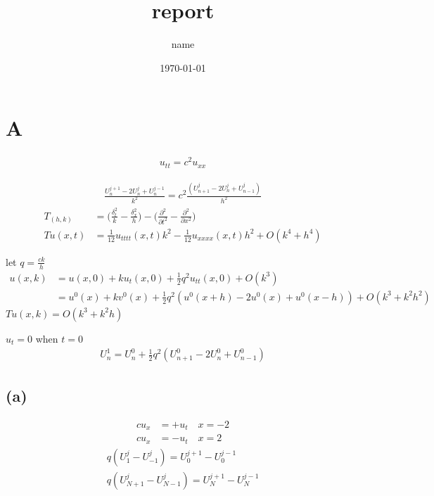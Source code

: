 \documentclass[en,hazy,screen,blue,normal]{elegantnote}
\title{report}
\author{name}
\date{\today}
\begin{document}
\maketitle

\section{A}
\begin{align*}
    u_{tt} = c^2 u_{xx}
\end{align*}

\begin{align}
    \frac{U_n^{j+1} - 2U_n^j + U_n^{j-1}}{k^2} = c^2 \frac{(U_{n+1}^j - 2U_n^j + U_{n-1}^j)}{h^2}
\end{align}
\begin{align*}
    T_{(h,k)} &= \biggl(\frac{\delta_t^2}{k} - \frac{\delta_x^2}{h}\biggr) - \biggl(\frac{\partial^2}{\partial t^2} - \frac{\partial^2}{\partial x^2}\biggr) \\
    Tu(x, t) &= \frac{1}{12} u_{tttt}(x, t) k^2 - \frac{1}{12} u_{xxxx}(x, t) h^2 + O(k^4 + h^4)
\end{align*}


let $q = \frac{ck}{h}$
\begin{align*}
    u(x, k) &= u(x, 0) + k u_t(x, 0) + \frac{1}{2} q^2 u_{tt}(x, 0) + O(k^3) \\
    &= u^0(x) + k v^0(x) + \frac{1}{2} q^2(u^0(x+h) - 2u^0(x) + u^0(x-h)) + O(k^3+k^2 h^2)
\end{align*}
$Tu(x, k) = O(k^3 + k^2h)$

$u_t = 0$ when $t=0$
\begin{align*}
    U_n^1 = U_n^0 + \frac{1}{2} q^2 (U_{n+1}^0 - 2U_{n}^0 + U_{n-1}^0)
\end{align*}

\subsection{(a)}
\begin{align*}
    c u_x &= + u_t \quad x=-2 \\
    c u_x &= - u_t \quad x=2
\end{align*}
\begin{align*}
    q (U_1^j - U_{-1}^j) = U_0^{j+1} - U_0^{j-1} \\
    q (U_{N+1}^j - U_{N-1}^j) = U_N^{j+1} - U_N^{j-1}
\end{align*}
\end{document}
